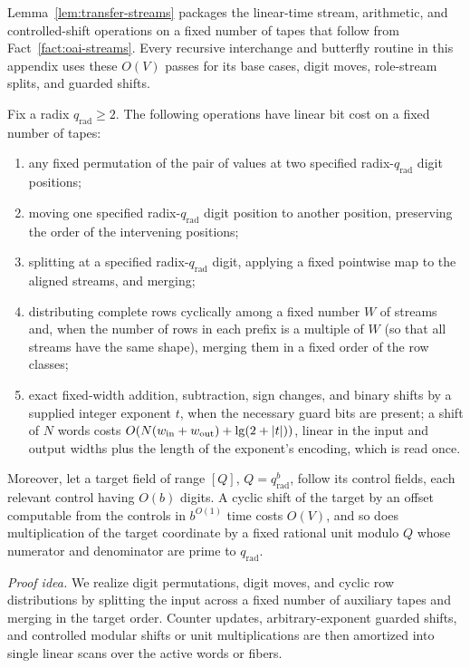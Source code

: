 Lemma~\ref{lem:transfer-streams} packages the linear-time stream, arithmetic, and controlled-shift operations on a fixed number of tapes that follow from Fact~\ref{fact:oai-streams}. Every recursive interchange and butterfly routine in this appendix uses these $O(V)$ passes for its base cases, digit moves, role-stream splits, and guarded shifts.

\begin{lemma}\label{lem:transfer-streams}
Fix a radix $q_{\mathrm{rad}}\ge2$. The following operations have linear bit cost on a fixed number of tapes:
\begin{enumerate}[label=(\arabic*),leftmargin=*]
\item any fixed permutation of the pair of values at two specified radix-$q_{\mathrm{rad}}$ digit positions;
\item moving one specified radix-$q_{\mathrm{rad}}$ digit position to another position, preserving the order of the
  intervening positions;
\item splitting at a specified radix-$q_{\mathrm{rad}}$ digit, applying a fixed pointwise map to the aligned
  streams, and merging;
\item distributing complete rows cyclically among a fixed number $W$ of streams and, when the number of rows in each
  prefix is a multiple of $W$ (so that all streams have the same shape), merging them in a fixed order of the row
  classes;
\item exact fixed-width addition, subtraction, sign changes, and binary shifts by a supplied integer exponent $t$, when
  the necessary guard bits are present; a shift of $N$ words costs $O(N(w_{\rm in}+w_{\rm out})+\lg(2+|t|))$, linear in
  the input and output widths plus the length of the exponent's encoding, which is read once.
\end{enumerate}
Moreover, let a target field of range $[Q]$, $Q=q_{\mathrm{rad}}^b$, follow its control fields, each relevant control
having $O(b)$ digits. A cyclic shift of the target by an offset computable from the controls in $b^{O(1)}$ time costs
$O(V)$, and so does multiplication of the target coordinate by a fixed rational unit modulo $Q$ whose numerator and
denominator are prime to $q_{\mathrm{rad}}$.
\end{lemma}

\emph{Proof idea.}
We realize digit permutations, digit moves, and cyclic row distributions by splitting the input across a fixed number of auxiliary tapes and merging in the target order. Counter updates, arbitrary-exponent guarded shifts, and controlled modular shifts or unit multiplications are then amortized into single linear scans over the active words or fibers.

